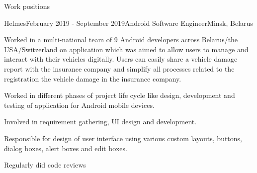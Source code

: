 \documentclass{resume} %
\begin{document}
\begin{rSection}{Work positions}
\begin{rSubsection}{Helmes}{February 2019 - September 2019}{Android Software Engineer}{Minsk, Belarus}
\item[] Worked in a multi-national team of 9 Android developers across Belarus/the USA/Switzerland on application which was aimed to allow users to manage and interact with their vehicles digitally. Users can easily share a vehicle damage report with the insurance company and simplify all processes related to the registration the vehicle damage in the insurance company.\smallskip \\


\item Worked in different phases of project life cycle like design, development and testing of application for Android mobile devices.
\item Involved in requirement gathering, UI design and development.
\item Responsible for design of user interface using various custom layouts, buttons, dialog boxes, alert boxes and edit boxes.
\item Regularly did code reviews
\end{rSubsection}




\end{rSection}
\end{document}
